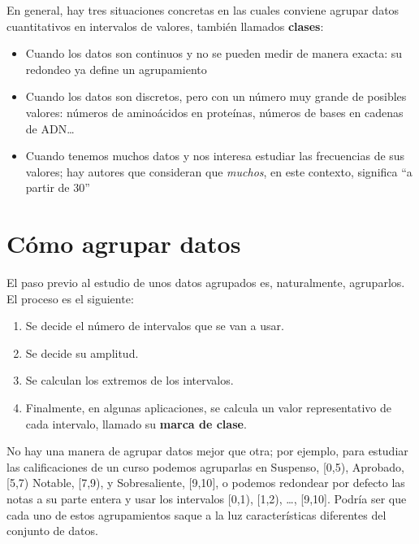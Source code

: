 \documentclass[]{book}
\providecommand{\tightlist}{%
  \setlength{\itemsep}{0pt}\setlength{\parskip}{0pt}}
\theoremstyle{definition}
\theoremstyle{definition}
\theoremstyle{definition}
\theoremstyle{remark}
\begin{document}
En general, hay tres situaciones concretas en las cuales conviene agrupar datos cuantitativos en intervalos de valores, también llamados \textbf{clases}:

\begin{itemize}
\item
  Cuando los datos son continuos y no se pueden medir de manera exacta: su redondeo ya define un agrupamiento
\item
  Cuando los datos son discretos, pero con un número muy grande de posibles valores: números de aminoácidos en proteínas, números de bases en cadenas de ADN\ldots{}
\item
  Cuando tenemos muchos datos y nos interesa estudiar las frecuencias de sus valores; hay autores que consideran que \emph{muchos}, en este contexto, significa ``a partir de 30''
\end{itemize}

\hypertarget{como-agrupar-datos}{%
\section{Cómo agrupar datos}\label{como-agrupar-datos}}

El paso previo al estudio de unos datos agrupados es, naturalmente, agruparlos. El proceso es el siguiente:

\begin{enumerate}
\def\labelenumi{\arabic{enumi}.}
\tightlist
\item
  Se decide el número de intervalos que se van a usar.
\item
  Se decide su amplitud.
\item
  Se calculan los extremos de los intervalos.
\item
  Finalmente, en algunas aplicaciones, se calcula un valor representativo de cada intervalo, llamado su \textbf{marca de clase}.
\end{enumerate}

No hay una manera de agrupar datos mejor que otra; por ejemplo, para estudiar las calificaciones de un curso podemos agruparlas en Suspenso, {[}0,5), Aprobado, {[}5,7) Notable, {[}7,9), y Sobresaliente, {[}9,10{]}, o podemos redondear por defecto las notas a su parte entera y usar los intervalos {[}0,1), {[}1,2), \ldots{}, {[}9,10{]}. Podría ser que cada uno de estos agrupamientos saque a la luz características diferentes del conjunto de datos.
\end{document}
